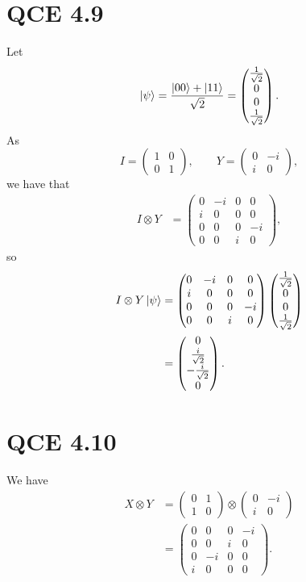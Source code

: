 \documentclass[10pt]{article}
\begin{document}
\section*{QCE 4.9}
Let 
\[
\ket{\psi} = \frac{\ket{00} + \ket{11}}{\sqrt{2}} = \begin{pmatrix}
\frac{1}{\sqrt{2}} \\
0 \\
0 \\
\frac{1}{\sqrt{2}}
\end{pmatrix}.
\]
As 
\[
I = \begin{pmatrix}
1 & 0 \\
0 & 1 
\end{pmatrix}, \qquad
Y = \begin{pmatrix}
0 & -i \\
i & 0
\end{pmatrix},
\]
we have that
\begin{align*}
I \otimes Y &=
\begin{pmatrix}
0 & -i & 0 & 0 \\
i  & 0  & 0 & 0 \\
0 & 0 & 0  & -i \\
0 & 0 & i   & 0
\end{pmatrix},
\end{align*}
so
\begin{align*}
I \otimes Y \ket{\psi} &= 
\begin{pmatrix}
0 & -i & 0 & 0 \\
i  & 0  & 0 & 0 \\
0 & 0 & 0  & -i \\
0 & 0 & i   & 0
\end{pmatrix}
\begin{pmatrix}
\frac{1}{\sqrt{2}} \\
0 \\
0 \\
\frac{1}{\sqrt{2}}
\end{pmatrix} \\
&= 
\begin{pmatrix}
0 \\
\frac{i}{\sqrt{2}} \\
-\frac{i}{\sqrt{2}} \\
0
\end{pmatrix}.
\end{align*}

\section*{QCE 4.10}
We have 
\begin{align*}
X \otimes Y &= 
\begin{pmatrix}
0 & 1 \\
1 & 0
\end{pmatrix}
\otimes 
\begin{pmatrix}
0 & -i \\
i & 0
\end{pmatrix} \\
&= 
\begin{pmatrix}
0 & 0  & 0 & -i \\
0 & 0  & i  & 0  \\
0 & -i & 0 & 0 \\
i  & 0  & 0 & 0
\end{pmatrix}.
\end{align*}
\end{document}
